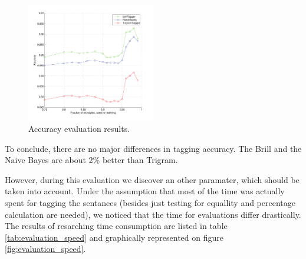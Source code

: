 \documentclass[11pt, conference, compsocconf]{IEEEtran}
\begin{document}
\begin{figure}[htb]
\begin{center}
\includegraphics[width=0.5\textwidth]{../evaluation/graph.pdf} 
\end{center}
\caption{Accuracy evaluation results.}
\label{fig:evaluation}
\end{figure}
\par
To conclude, there are no major differences in tagging accuracy. The Brill and the Naive Bayes are about 2\% better than Trigram.
\par
However, during this evaluation we discover an other paramater, which should be taken into account.
Under the assumption that most of the time was actually spent for tagging the sentances (besides just testing for equallity and percentage calculation are needed), we noticed that the time for evaluations differ drastically.
The results of resarching time consumption are listed in table \ref{tab:evaluation_speed} and graphically represented on figure \ref{fig:evaluation_speed}.
\end{document}
